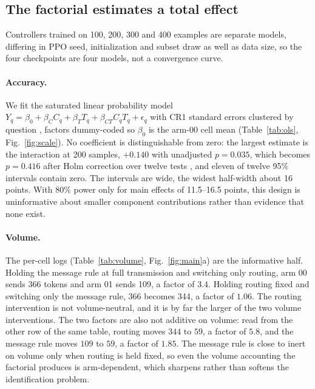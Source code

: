 \documentclass[11pt]{article}
\begin{document}
\subsection{The factorial estimates a total effect}
\label{sec:rq3}


Controllers trained on 100, 200, 300 and 400 examples are separate models,
differing in PPO seed, initialization and subset draw as well as data size, so
the four checkpoints are four models, not a convergence curve.

\paragraph{Accuracy.} We fit the saturated linear probability model
$Y_q=\beta_0+\beta_C C_q+\beta_T T_q+\beta_{CT}C_qT_q+\epsilon_q$ with CR1
standard errors clustered by question \citep{cameron2015practitioner}, factors
dummy-coded so $\beta_0$ is the arm-00 cell mean (Table~\ref{tab:ols},
Fig.~\ref{fig:scale}). No coefficient is distinguishable from zero: the largest estimate is the
interaction at 200 samples, $+0.140$ with unadjusted $p=0.035$, which becomes
$p=0.416$ after Holm correction over twelve tests \citep{holm1979simple}, and
eleven of twelve 95\% intervals contain zero. The intervals are wide, the widest
half-width about 16 points. With 80\% power only for main effects of 11.5--16.5
points, this design is uninformative about smaller component contributions rather
than evidence that none exist.

\paragraph{Volume.} The per-cell logs (Table~\ref{tab:volume},
Fig.~\ref{fig:main}a) are the informative half. Holding the message rule at full transmission and switching
only routing, arm 00 sends 366 tokens and arm 01 sends 109, a factor of $3.4$.
Holding routing fixed and switching only the message rule, 366 becomes 344, a
factor of $1.06$. The routing intervention is not volume-neutral, and it is by
far the larger of the two volume interventions. The two factors are also not
additive on volume: read from the other row of the same table, routing moves
$344$ to $59$, a factor of $5.8$, and the message rule moves $109$ to $59$, a
factor of $1.85$. The message rule is close to inert on volume only when routing
is held fixed, so even the volume accounting the factorial produces is
arm-dependent, which sharpens rather than softens the identification problem.
\end{document}
